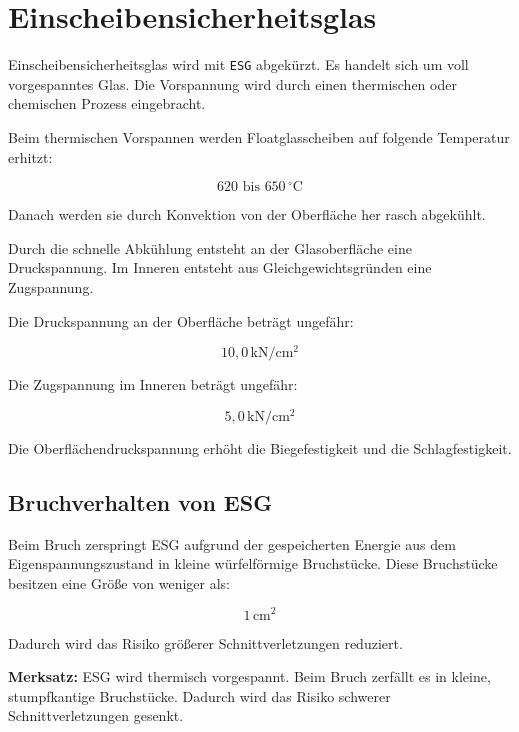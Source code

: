 \documentclass[
  12pt,
  a4paper,
  oneside
]{scrreprt}
\begin{document}
\section{Einscheibensicherheitsglas}

Einscheibensicherheitsglas wird mit \texttt{ESG} abgekürzt. Es handelt
sich um voll vorgespanntes Glas. Die Vorspannung wird durch einen
thermischen oder chemischen Prozess eingebracht. 

Beim thermischen Vorspannen werden Floatglasscheiben auf folgende
Temperatur erhitzt:

\begin{equation}
  620 \text{ bis } 650\,^\circ\mathrm{C}
\end{equation}

Danach werden sie durch Konvektion von der Oberfläche her rasch
abgekühlt. 

Durch die schnelle Abkühlung entsteht an der Glasoberfläche eine
Druckspannung. Im Inneren entsteht aus Gleichgewichtsgründen eine
Zugspannung. 

Die Druckspannung an der Oberfläche beträgt ungefähr:

\begin{equation}
  10{,}0\,\mathrm{kN/cm^2}
\end{equation}

Die Zugspannung im Inneren beträgt ungefähr:

\begin{equation}
  5{,}0\,\mathrm{kN/cm^2}
\end{equation}

Die Oberflächendruckspannung erhöht die Biegefestigkeit und die
Schlagfestigkeit. 

\subsection{Bruchverhalten von ESG}

Beim Bruch zerspringt ESG aufgrund der gespeicherten Energie aus dem
Eigenspannungszustand in kleine würfelförmige Bruchstücke. Diese
Bruchstücke besitzen eine Größe von weniger als:

\begin{equation}
  1\,\mathrm{cm^2}
\end{equation}

Dadurch wird das Risiko größerer Schnittverletzungen reduziert.


\begin{merksatzbox}
\textbf{Merksatz:}
ESG wird thermisch vorgespannt. Beim Bruch zerfällt es in kleine,
stumpfkantige Bruchstücke. Dadurch wird das Risiko schwerer
Schnittverletzungen gesenkt.

\end{merksatzbox}
\end{document}

